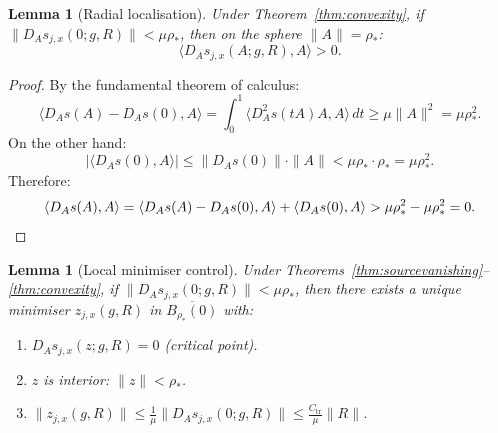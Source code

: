 \documentclass[12pt]{article}
\theoremstyle{plain}
\newtheorem{lemma}[theorem]{Lemma}
\theoremstyle{definition}
\numberwithin{equation}{section}
\newcommand{\tr}{\mathrm{tr}}
\begin{document}
\begin{lemma}[Radial localisation]\label{lem:radial}
Under Theorem~\ref{thm:convexity}, if $\|D_A s_{j,x}(0;g,R)\|<\mu\rho_*$, then on the sphere $\|A\|=\rho_*$:
\begin{equation}
\langle D_A s_{j,x}(A;g,R),A\rangle > 0.
\end{equation}
\end{lemma}

\begin{proof}
By the fundamental theorem of calculus:
\begin{equation}
\langle D_A s(A)-D_A s(0),A\rangle = \int_0^1\langle D_A^2 s(tA)A,A\rangle\,dt \geq \mu\|A\|^2 = \mu\rho_*^2.
\end{equation}
On the other hand:
\begin{equation}
|\langle D_A s(0),A\rangle| \leq \|D_A s(0)\|\cdot\|A\| < \mu\rho_*\cdot\rho_* = \mu\rho_*^2.
\end{equation}
Therefore:
\begin{equation}
\langle D_A s(A),A\rangle = \langle D_A s(A)-D_A s(0),A\rangle + \langle D_A s(0),A\rangle > \mu\rho_*^2-\mu\rho_*^2 = 0.\qedhere
\end{equation}
\end{proof}

\begin{lemma}[Local minimiser control]\label{lem:minimiser}
Under Theorems~\ref{thm:sourcevanishing}--\ref{thm:convexity}, if $\|D_As_{j,x}(0;g,R)\|<\mu\rho_*$, then there exists a unique minimiser $z_{j,x}(g,R)$ in $\overline{B_{\rho_*}(0)}$ with:
\begin{enumerate}[label=(\roman*)]
\item $D_A s_{j,x}(z;g,R)=0$ (critical point).
\item $z$ is interior: $\|z\|<\rho_*$.
\item $\|z_{j,x}(g,R)\|\leq\frac{1}{\mu}\|D_As_{j,x}(0;g,R)\|\leq\frac{C_{\tr}}{\mu}\|R\|$.
\end{enumerate}
\end{lemma}
\end{document}
